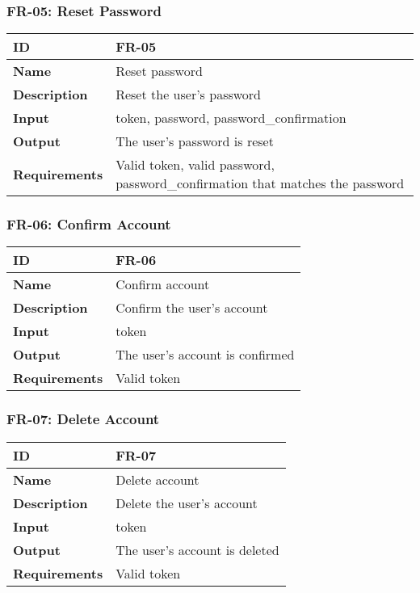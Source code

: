 \subsubsection{FR-05: Reset Password}
\begin{center}
  \begin{tabularx}{\textwidth}{|l|X|}
      \hline
      \textbf{ID} & FR-05 \\
      \hline
      \textbf{Name} & Reset password \\
      \hline
      \textbf{Description} & Reset the user's password \\
      \hline
      \textbf{Input} & token, password, password\_confirmation \\
      \hline
      \textbf{Output} & The user's password is reset \\
      \hline
      \textbf{Requirements} & Valid token, valid password, password\_confirmation that matches the password \\
      \hline
  \end{tabularx}
\end{center}


\subsubsection{FR-06: Confirm Account}
\begin{center}
  \begin{tabularx}{\textwidth}{|l|X|}
      \hline
      \textbf{ID} & FR-06 \\
      \hline
      \textbf{Name} & Confirm account \\
      \hline
      \textbf{Description} & Confirm the user's account \\
      \hline
      \textbf{Input} & token \\
      \hline
      \textbf{Output} & The user's account is confirmed \\
      \hline
      \textbf{Requirements} & Valid token \\
      \hline
  \end{tabularx}
\end{center}

\subsubsection{FR-07: Delete Account}
\begin{center}
  \begin{tabularx}{\textwidth}{|l|X|}
      \hline
      \textbf{ID} & FR-07 \\
      \hline
      \textbf{Name} & Delete account \\
      \hline
      \textbf{Description} & Delete the user's account \\
      \hline
      \textbf{Input} & token \\
      \hline
      \textbf{Output} & The user's account is deleted \\
      \hline
      \textbf{Requirements} & Valid token \\
      \hline
  \end{tabularx}
\end{center}

